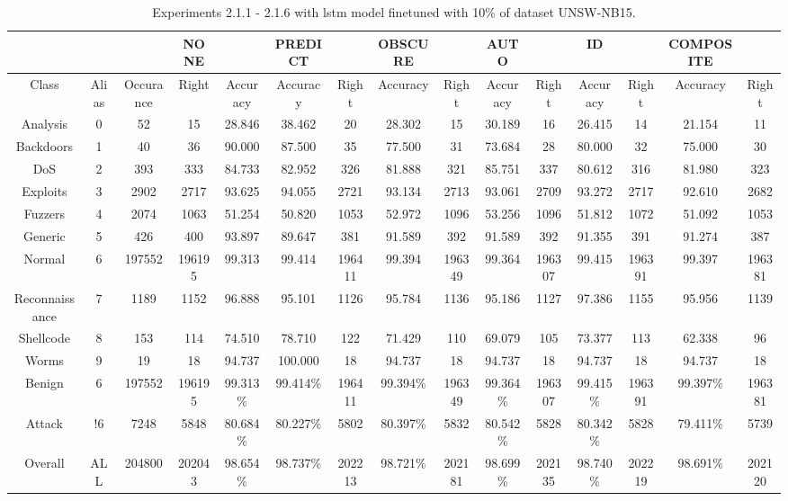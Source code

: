 \begin{table}[htb]
    \centering
    \begin{tabular}{@{}ccccccccccccccc@{}}
        \toprule
         &  &  & NONE &  & PREDICT &  & OBSCURE &  & AUTO &  & ID &  & COMPOSITE &  \\
        \midrule
        Class &  Alias &  Occurance &  Right &  Accuracy &  Accuracy &  Right &  Accuracy &  Right &  Accuracy &  Right &  Accuracy &  Right &  Accuracy &  Right \\
        Analysis &  0 &  52 &  15 &  28.846 &  38.462 &  20 &  28.302 &  15 &  30.189 &  16 &  26.415 &  14 &  21.154 &  11 \\
        Backdoors &  1 &  40 &  36 &  90.000 &  87.500 &  35 &  77.500 &  31 &  73.684 &  28 &  80.000 &  32 &  75.000 &  30 \\
        DoS &  2 &  393 &  333 &  84.733 &  82.952 &  326 &  81.888 &  321 &  85.751 &  337 &  80.612 &  316 &  81.980 &  323 \\
        Exploits &  3 &  2902 &  2717 &  93.625 &  94.055 &  2721 &  93.134 &  2713 &  93.061 &  2709 &  93.272 &  2717 &  92.610 &  2682 \\
        Fuzzers &  4 &  2074 &  1063 &  51.254 &  50.820 &  1053 &  52.972 &  1096 &  53.256 &  1096 &  51.812 &  1072 &  51.092 &  1053 \\
        Generic &  5 &  426 &  400 &  93.897 &  89.647 &  381 &  91.589 &  392 &  91.589 &  392 &  91.355 &  391 &  91.274 &  387 \\
        Normal &  6 &  197552 &  196195 &  99.313 &  99.414 &  196411 &  99.394 &  196349 &  99.364 &  196307 &  99.415 &  196391 &  99.397 &  196381 \\
        Reconnaissance &  7 &  1189 &  1152 &  96.888 &  95.101 &  1126 &  95.784 &  1136 &  95.186 &  1127 &  97.386 &  1155 &  95.956 &  1139 \\
        Shellcode &  8 &  153 &  114 &  74.510 &  78.710 &  122 &  71.429 &  110 &  69.079 &  105 &  73.377 &  113 &  62.338 &  96 \\
        Worms &  9 &  19 &  18 &  94.737 &  100.000 &  18 &  94.737 &  18 &  94.737 &  18 &  94.737 &  18 &  94.737 &  18 \\
        Benign &  6 &  197552 &  196195 &  99.313\% &  99.414\% &  196411 &  99.394\% &  196349 &  99.364\% &  196307 &  99.415\% &  196391 &  99.397\% &  196381 \\
        Attack &  !6 &  7248 &  5848 &  80.684\% &  80.227\% &  5802 &  80.397\% &  5832 &  80.542\% &  5828 &  80.342\% &  5828 &  79.411\% &  5739 \\
        Overall &  ALL &  204800 &  202043 &  98.654\% &  98.737\% &  202213 &  98.721\% &  202181 &  98.699\% &  202135 &  98.740\% &  202219 &  98.691\% &  202120 \\
        \bottomrule
    \end{tabular}
    \caption{Experiments 2.1.1 - 2.1.6 with \gls{lstm} model finetuned with 10\% of dataset UNSW-NB15.}
    \label{table:results:lstm:flows15_10}
\end{table}